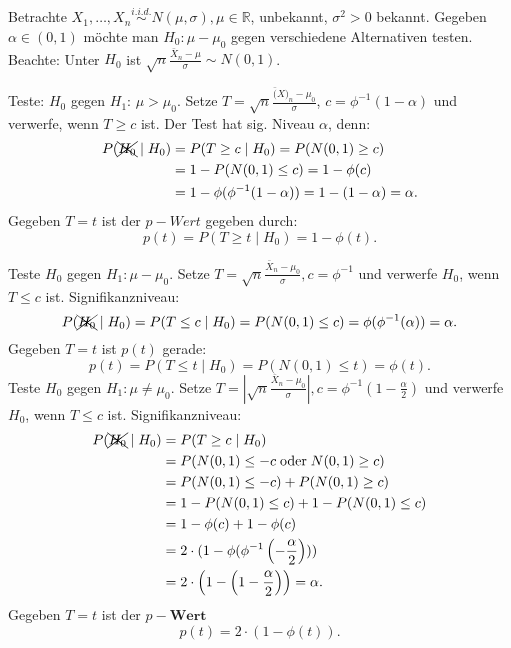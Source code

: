 \documentclass[10pt]{article}
\newcommand{\FZV}{X_1, \ldots, X_n} %
\newcommand{\IR}{\mathbb{R}} %
\newenvironment{BSP}[1][]
{\begin{Beispiel}[frametitle=#1]}{\end{Beispiel}}
\begin{document}
	\begin{BSP}[Beispiel 2.0.3 (Der z-Test (bekannte Varianz))]
		Betrachte $\FZV \overset{i.i.d.}{\sim} N(\mu,\sigma), \mu \in \IR$, unbekannt, $\sigma^2 > 0$ bekannt. Gegeben $\alpha \in (0,1)$ möchte man $H_0: \mu - \mu_0$ gegen verschiedene Alternativen testen. Beachte: Unter $H_0$ ist $\sqrt{n} \frac{\bar{X}_n - \mu}{\sigma} \sim N(0,1)$.
		
		Teste: $H_0$ gegen $H_1$: $\mu > \mu_0$. Setze $T = \sqrt{n} \frac{\bar(X)_n - \mu_0}{\sigma}$, $c = \phi^{-1} (1- \alpha)$ und verwerfe, wenn $T\geq c$ ist. 
		Der Test hat sig. Niveau $\alpha$, denn: 
		\begin{equation*}
			\begin{split}
				P(\xcancel{H_0} \mid H_0) &= P(T \geq c \mid H_0) = P(N(0,1) \geq c)\\
				&= 1- P(N(0,1) \leq c) = 1- \phi(c)\\
				&= 1- \phi(\phi^{-1}(1-\alpha)) = 1-(1-\alpha) = \alpha.
			\end{split}
		\end{equation*}
		Gegeben $T=t$ ist der $p-Wert$ gegeben durch:
		\begin{equation*}
			p(t) = P(T \geq t \mid H_0) = 1-\phi(t). 
		\end{equation*}
		
		Teste $H_0$ gegen $H_1 : \mu - \mu_0$. Setze $T = \sqrt{n} \frac{\bar{X}_n - \mu_0}{\sigma}, c = \phi^{-1}$ und verwerfe $H_0$, wenn $T \leq c$ ist. Signifikanzniveau:
		\begin{equation*}
			P(\xcancel{H_0} \mid H_0) = P(T \leq c \mid H_0) = P(N(0,1) \leq c) = \phi(\phi^{-1}(\alpha)) = \alpha.
		\end{equation*}
		Gegeben $T=t$ ist $p(t)$ gerade:
		\begin{equation*}
			p(t) = P(T \leq t \mid H_0) = P(N(0,1) \leq t) = \phi(t).
		\end{equation*}
		Teste $H_0$ gegen $H_1: \mu \neq \mu_0$. Setze $T = \left\vert \sqrt{n} \frac{\bar{X}_n -\mu_0}{\sigma} \right\vert, c = \phi^{-1} \left(1 -\frac{\alpha}{2}\right)$ und verwerfe $H_0$, wenn $T \leq c$ ist. Signifikanzniveau:
		\begin{equation*}
			\begin{split}
				P(\xcancel{H_0} \mid H_0) &= P(T \geq c \mid H_0)\\
				&= P(N(0,1) \leq -c \; \text{oder} \; N(0,1) \geq c)\\
				&= P(N(0,1) \leq -c) + P(N(0,1) \geq c)\\
				&= 1- P(N(0,1) \leq c) + 1 - P(N(0,1) \leq c)\\
				&= 1- \phi(c) + 1- \phi(c)\\
				&= 2 \cdot (1- \phi(\phi^{-1} \left(- \frac{\alpha}{2}\right)))\\
				&= 2 \cdot \left(1-\left(1-\frac{\alpha}{2}\right)\right) = \alpha.
			\end{split}
		\end{equation*}
		Gegeben $T=t$ ist der $p-\textbf{Wert}$
		\begin{equation*}
			p(t) = 2\cdot(1-\phi(t)).
		\end{equation*}
	\end{BSP}
\end{document}
